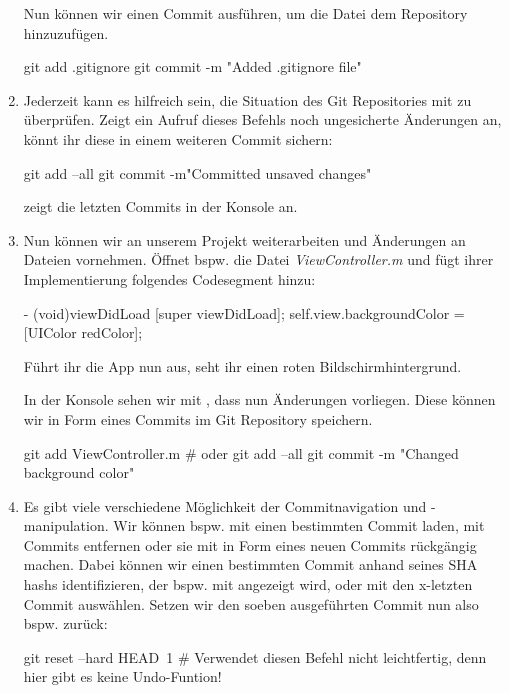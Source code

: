 \documentclass[parskip=half, final]{scrreprt}
\begin{document}
\begin{lecture}
\begin{enumerate}
Nun können wir einen Commit ausführen, um die Datei dem Repository hinzuzufügen.

\begin{shlst}
git add .gitignore
git commit -m "Added .gitignore file"
\end{shlst}

\item Jederzeit kann es hilfreich sein, die Situation des Git Repositories mit  zu überprüfen. Zeigt ein Aufruf dieses Befehls noch ungesicherte Änderungen an, könnt ihr diese in einem weiteren Commit sichern:

\begin{shlst}
git add --all
git commit -m"Committed unsaved changes"
\end{shlst}

 zeigt die letzten Commits in der Konsole an.

\item Nun können wir an unserem Projekt weiterarbeiten und Änderungen an Dateien vornehmen. Öffnet bspw. die Datei \emph{ViewController.m} und fügt ihrer Implementierung folgendes Codesegment hinzu:

\begin{objclst}
- (void)viewDidLoad {
    [super viewDidLoad];
    self.view.backgroundColor = [UIColor redColor];
}
\end{objclst}

Führt ihr die App nun aus, seht ihr einen roten Bildschirmhintergrund.

In der Konsole sehen wir mit , dass nun Änderungen vorliegen. Diese können wir in Form eines Commits im Git Repository speichern.

\begin{shlst}
git add ViewController.m # oder git add --all
git commit -m "Changed background color"
\end{shlst}

\item Es gibt viele verschiedene Möglichkeit der Commitnavigation und -manipulation. Wir können bspw. mit  einen bestimmten Commit laden, mit  Commits entfernen oder sie mit  in Form eines neuen Commits rückgängig machen. Dabei können wir einen bestimmten Commit anhand seines SHA hashs identifizieren, der bspw. mit  angezeigt wird, oder mit  den x-letzten Commit auswählen. Setzen wir den soeben ausgeführten Commit nun also bspw. zurück:

\begin{shlst}
git reset --hard HEAD~1 # Verwendet diesen Befehl nicht leichtfertig, denn hier gibt es keine Undo-Funtion!
\end{shlst}


\end{enumerate}
\end{lecture}
\end{document}
